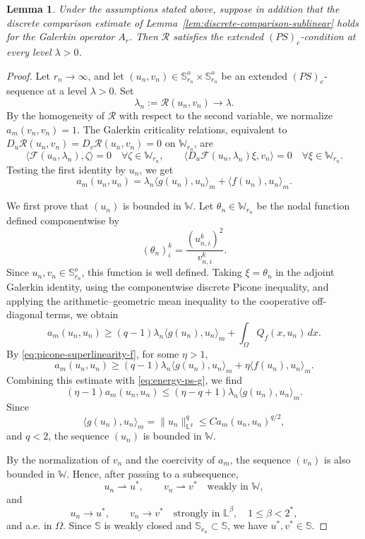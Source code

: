 \documentclass[preprint,10pt]{elsarticle}
\numberwithin{equation}{section}
\newtheorem{lem}[thm]{Lemma}
\begin{document}
\begin{lem}\label{lem:PS-application}
	Under the assumptions stated above, suppose in addition that the discrete
	comparison estimate of Lemma~\ref{lem:discrete-comparison-sublinear}
	holds for the Galerkin operator \(A_r\). Then \(\mathcal R\) satisfies the
	extended \((PS)_e\)-condition at every level \(\lambda>0\).
\end{lem}

\begin{proof}
	Let \(r_n\to\infty\), and let
	\((u_n,v_n)\in\mathbb S_{r_n}^o\times\mathbb S_{r_n}^o\) be an extended
	\((PS)_e\)-sequence at a level \(\lambda>0\). Set
	\[
	\lambda_n:=\mathcal R(u_n,v_n)\to\lambda .
	\]
	By the homogeneity of \(\mathcal R\) with respect to the second variable,
	we normalize \(a_m(v_n,v_n)=1\). The Galerkin criticality relations,
	equivalent to \(D_u\mathcal R(u_n,v_n)=D_v\mathcal R(u_n,v_n)=0\) on
	\(\mathbb W_{r_n}\), are
	\[
	\langle\mathcal F(u_n,\lambda_n),\zeta\rangle=0
	\quad \forall \zeta\in\mathbb W_{r_n},
	\qquad
	\bigl\langle D_u\mathcal F(u_n,\lambda_n)\xi,v_n\bigr\rangle=0
	\quad \forall \xi\in\mathbb W_{r_n}.
	\]
	Testing the first identity by \(u_n\), we get
	\begin{equation}\label{eq:energy-ps-g}
		a_m(u_n,u_n)
		=
		\lambda_n\langle g(u_n),u_n\rangle_m
		+
		\langle f(u_n),u_n\rangle_m .
	\end{equation}
	
	We first prove that \((u_n)\) is bounded in \(\mathbb W\). Let
	\(\theta_n\in\mathbb W_{r_n}\) be the nodal function defined componentwise by
	\[
	(\theta_n)_i^k=\frac{(u_{n,i}^k)^2}{v_{n,i}^k}.
	\]
	Since \(u_n,v_n\in\mathbb S_{r_n}^o\), this function is well defined. Taking
	\(\xi=\theta_n\) in the adjoint Galerkin identity, using the componentwise
	discrete Picone inequality, and applying the arithmetic--geometric mean
	inequality to the cooperative off-diagonal terms, we obtain
	\[
	a_m(u_n,u_n)
	\ge
	(q-1)\lambda_n\langle g(u_n),u_n\rangle_m
	+
	\int_\Omega Q_f(x,u_n)\,dx .
	\]
	By \eqref{eq:picone-superlinearity-f}, for some \(\eta>1\),
	\[
	a_m(u_n,u_n)
	\ge
	(q-1)\lambda_n\langle g(u_n),u_n\rangle_m
	+
	\eta\langle f(u_n),u_n\rangle_m .
	\]
	Combining this estimate with \eqref{eq:energy-ps-g}, we find
	\[
	(\eta-1)a_m(u_n,u_n)
	\le
	(\eta-q+1)\lambda_n\langle g(u_n),u_n\rangle_m .
	\]
	Since
	\[
	\langle g(u_n),u_n\rangle_m
	=
	\|u_n\|_{\mathbb L^q}^q
	\le
	Ca_m(u_n,u_n)^{q/2},
	\]
	and \(q<2\), the sequence \((u_n)\) is bounded in \(\mathbb W\).
	
	By the normalization of \(v_n\) and the coercivity of \(a_m\), the sequence
	\((v_n)\) is also bounded in \(\mathbb W\). Hence, after passing to a
	subsequence,
	\[
	u_n\rightharpoonup u^*,
	\qquad
	v_n\rightharpoonup v^*
	\quad\text{weakly in }\mathbb W,
	\]
	and
	\[
	u_n\to u^*,
	\qquad
	v_n\to v^*
	\quad\text{strongly in }\mathbb L^\beta,\quad 1\le\beta<2^*,
	\]
	and a.e. in \(\Omega\). Since \(\mathbb S\) is weakly closed and
	\(\mathbb S_{r_n}\subset\mathbb S\), we have \(u^*,v^*\in\mathbb S\).
	

\end{proof}
\end{document}

